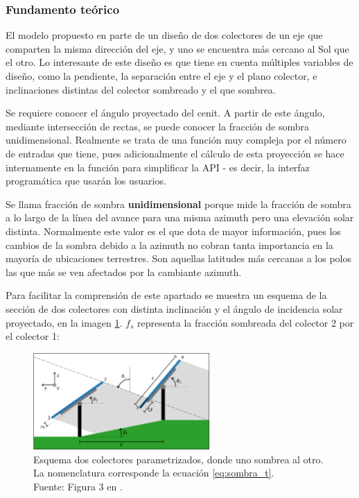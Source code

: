 \subsubsection{Fundamento teórico}

El \gls{modelo} propuesto en \cite{Anderson_Jensen_2024} parte de un diseño de dos \gls{colectores} de un eje que comparten la misma dirección del eje, y uno se encuentra más cercano al Sol que el otro. Lo interesante de este diseño es que tiene en cuenta múltiples variables de diseño, como la pendiente, la separación entre el eje y el plano colector, e inclinaciones distintas del colector sombreado y el que sombrea.

Se requiere conocer el ángulo proyectado del \gls{cenit}. A partir de este ángulo, mediante intersección de rectas, se puede conocer la fracción de \gls{sombra} unidimensional. Realmente se trata de una función muy compleja por el número de entradas que tiene, pues adicionalmente el cálculo de esta proyección se hace internamente en la función para simplificar la \gls{API} - es decir, la interfaz programática que usarán los usuarios.

Se llama fracción de \gls{sombra} \textbf{unidimensional} porque mide la fracción de \gls{sombra} a lo largo de la línea del avance para una misma azimuth pero una elevación solar distinta. Normalmente este valor es el que dota de mayor información, pues los cambios de la \gls{sombra} debido a la azimuth no cobran tanta importancia en la mayoría de ubicaciones terrestres. Son aquellas latitudes más cercanas a los polos las que más se ven afectados por la cambiante azimuth.

Para facilitar la comprensión de este apartado se muestra un esquema de la sección de dos \gls{colectores} con distinta inclinación y el ángulo de incidencia solar proyectado, en la imagen \ref{fig:fraccion_sombra}. $f_s$ representa la fracción sombreada del colector 2 por el colector 1:

\begin{figure}[H]
    \centering
    \includegraphics[width=0.6\textwidth]{./images/shading_1d/Anderson_Jensen_Fig3.png}
    \caption{Esquema dos \gls{colectores} parametrizados, donde uno sombrea al otro. La nomenclatura corresponde la ecuación \ref{eq:sombra_t}.\\Fuente: Figura 3 en \cite{Anderson_Jensen_2024}.}
    \label{fig:fraccion_sombra}
\end{figure}

